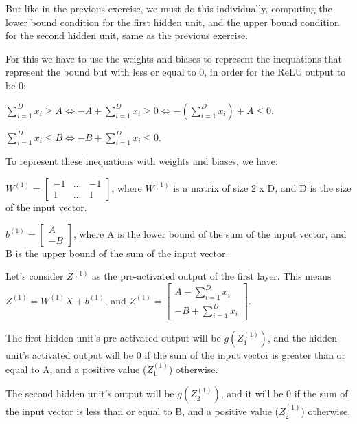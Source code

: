 \documentclass{article}
\begin{document}
But like in the previous exercise, we must do this individually, computing the lower bound condition for the first hidden unit, 
and the upper bound condition for the second hidden unit, same as the previous exercise.

\bigskip

For this we have to use the weights and biases to represent the inequations that represent the bound but with less or equal to 0, in order for
the ReLU output to be 0:

\bigskip

$ \sum_{i=1}^{D} x_i \geq A \iff -A + \sum_{i=1}^{D} x_i \geq 0 \iff -(\sum_{i=1}^{D} x_i) + A \leq 0$.

\medskip

$ \sum_{i=1}^{D} x_i \leq B \iff -B + \sum_{i=1}^{D} x_i \leq 0$.

\bigskip

To represent these inequations with weights and biases, we have:

\bigskip

\( W^{(1)} = \begin{bmatrix}
    -1 & ...  & -1\\
    1 & ... & 1
\end{bmatrix}
\), where \(W^{(1)}\) is a matrix of size 2 x D, and D is the size of the input vector.

\bigskip

\(b^{(1)} = \begin{bmatrix}
    A\\
    -B
\end{bmatrix}
\), where A is the lower bound of the sum of the input vector, and B is the upper bound of the sum of the input vector.

\bigskip

Let's consider $Z^{(1)}$ as the pre-activated output of the first layer. This means $Z^{(1)} = W^{(1)}X + b^{(1)}$, and
$Z^{(1)} = \begin{bmatrix}
    A -\sum_{i=1}^{D} x_i\\
    -B + \sum_{i=1}^{D} x_i
\end{bmatrix}
$.

\bigskip

The first hidden unit's pre-activated output will be $g(Z_1^{(1)})$, and the hidden unit's activated output 
will be 0 if the sum of the input vector is greater than or equal to A, and a positive value ($Z_1^{(1)}$) otherwise.

The second hidden unit's output will be $g(Z_2^{(1)})$, and it will be 0 if the sum of the input vector is less than or equal to B, 
and a positive value ($Z_2^{(1)}$) otherwise.
\end{document}
